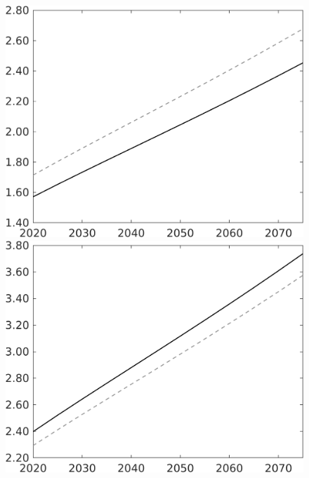 \documentclass[12pt]{article}
\begin{document}
\begin{figure}[h!!]
\begin{minipage}[]{0.32\textwidth}
	\end{minipage}	
	\begin{minipage}[]{0.32\textwidth}
		\includegraphics[width=1\textwidth]{../../codding_model/own_basedOnFried/optimalPol_010922_revision/figures/all_13Sept22/CompTaul_Equlab_LFBAU_Reg0_Y_spillover0_nsk0_xgr0_knspil1_sep1_countec0_GovRev0_etaa0.79_lgd0.png}
	\end{minipage}	
	\begin{minipage}[]{0.32\textwidth}
		\includegraphics[width=1\textwidth]{../../codding_model/own_basedOnFried/optimalPol_010922_revision/figures/all_13Sept22/CompTaul_Equlab_LFBAU_Reg0_wh_spillover0_nsk0_xgr0_knspil1_sep1_countec0_GovRev0_etaa0.79_lgd0.png}
	\end{minipage}
\end{figure}
\end{document}
